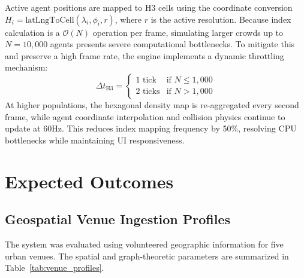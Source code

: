 \documentclass[12pt,a4paper,oneside]{report}
\begin{document}
Active agent positions are mapped to H3 cells using the coordinate conversion $H_i = \text{latLngToCell}(\lambda_i, \phi_i, r)$, where $r$ is the active resolution. Because index calculation is a $\mathcal{O}(N)$ operation per frame, simulating larger crowds up to $N = 10,000$ agents presents severe computational bottlenecks. To mitigate this and preserve a high frame rate, the engine implements a dynamic throttling mechanism:
\begin{equation}
\Delta t_{\text{H3}} = \begin{cases} 
1 \text{ tick} & \text{if } N \le 1,000 \\ 
2 \text{ ticks} & \text{if } N > 1,000 
\end{cases}
\label{eq:h3_throttling}
\end{equation}
At higher populations, the hexagonal density map is re-aggregated every second frame, while agent coordinate interpolation and collision physics continue to update at 60Hz. This reduces index mapping frequency by 50\%, resolving CPU bottlenecks while maintaining UI responsiveness.

\chapter{Expected Outcomes}

\section{Geospatial Venue Ingestion Profiles}
The system was evaluated using volunteered geographic information for five urban venues. The spatial and graph-theoretic parameters are summarized in Table~\ref{tab:venue_profiles}.

\begin{table}[H]
\centering
\caption{Geospatial Venue Ingestion Profiles and Graph Scales}
\label{tab:venue_profiles}
\end{table}
\end{document}
